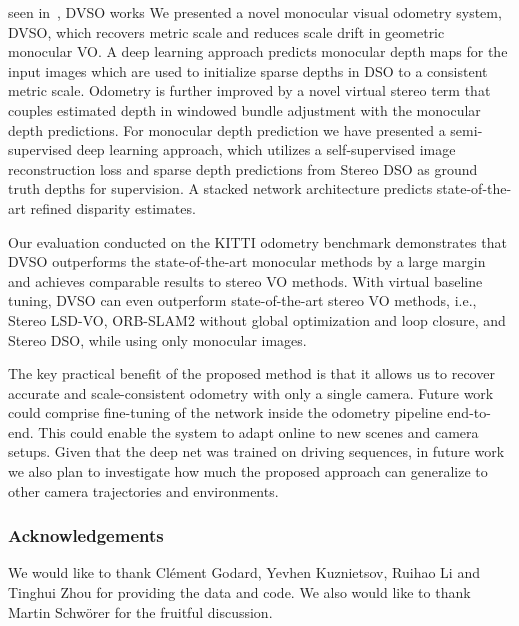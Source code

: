 \documentclass[runningheads]{llncs}
\begin{document}
seen in~, DVSO works %
We presented a novel monocular visual odometry system, DVSO, which recovers metric scale and 
reduces scale drift in geometric monocular VO. A deep learning approach predicts monocular
depth maps for the input images which are used to initialize sparse depths in DSO to a consistent 
metric scale. Odometry is further improved by a novel 
virtual stereo term that couples estimated depth in windowed bundle adjustment with the monocular depth predictions. 
For monocular depth prediction we have presented a semi-supervised deep learning 
approach, which utilizes a self-supervised image reconstruction loss and sparse depth predictions from Stereo DSO as 
ground truth depths for supervision. A stacked network
architecture predicts state-of-the-art refined disparity estimates. 

Our evaluation conducted on the KITTI odometry benchmark demonstrates that DVSO outperforms the 
state-of-the-art monocular methods by a large margin and 
achieves comparable results to stereo VO methods. With virtual baseline tuning, 
DVSO can even outperform state-of-the-art stereo VO 
methods, i.e., Stereo LSD-VO, ORB-SLAM2 without global optimization and loop closure, and Stereo DSO, while using 
only monocular images.

The key practical benefit of the proposed method is that it allows us to recover accurate and scale-consistent odometry with only a single camera.
Future work could comprise fine-tuning of the network inside the odometry pipeline end-to-end.
This could enable the system to adapt online to new scenes and camera setups.
Given that the deep net was trained on driving sequences, in future work we 
also plan to investigate how much the proposed approach can generalize to other 
camera trajectories and environments.

\subsubsection{Acknowledgements} We would like to thank Cl\'{e}ment Godard, 
Yevhen Kuznietsov, Ruihao Li and Tinghui Zhou for providing the data and code. 
We also would like to thank Martin Schw\"{o}rer for the fruitful 
discussion.
\end{document}
